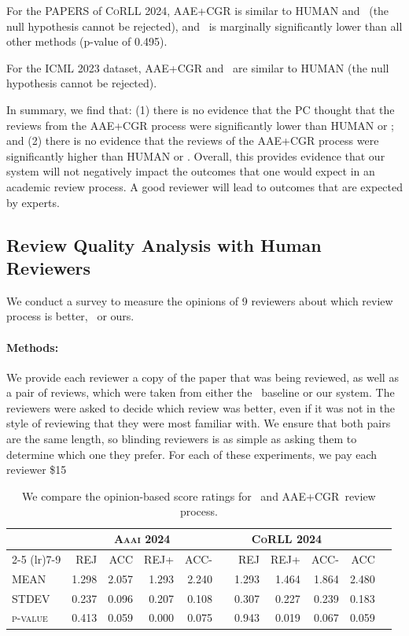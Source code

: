\begin{minipage}[t]{\linewidth}
For the PAPERS of \textsc{CoRLL 2024}, AAE+CGR is similar to HUMAN and \singlellm\ (the null hypothesis cannot be rejected), and \reviewergpt\ is marginally significantly lower than all other methods (p-value of 0.495).

For the \textsc{ICML 2023} dataset, AAE+CGR and \singlellm\ are similar to HUMAN (the null hypothesis cannot be rejected).

In summary, we find that: (1) there is no evidence that the PC thought that the reviews from the AAE+CGR process were significantly lower than HUMAN or \singlellm; and (2) there is no evidence that the reviews of the AAE+CGR process were significantly higher than HUMAN or \singlellm. 
Overall, this provides evidence that our system will not negatively impact the outcomes that one would expect in an academic review process. 
A good reviewer will lead to outcomes that are expected by experts. 
\subsection{Review Quality Analysis with Human Reviewers}

We conduct a survey to measure the opinions of 9 reviewers about which review process is better, \singlellm\ or ours. 

\paragraph{Methods:}
We provide each reviewer a copy of the paper that was being reviewed, as well as a pair of reviews, which were taken from either the \singlellm\ baseline or our system. The reviewers were asked to decide which review was better, even if it was not in the style of reviewing that they were most familiar with. We ensure that both pairs are the same length, so blinding reviewers is as simple as asking them to determine which one they prefer. For each of these experiments, we pay each reviewer \$15 

\begin{table}[t]
\centering
\caption{We compare the opinion-based score ratings for \singlellm\ and AAE+CGR\ review process.}
\begin{tabular}{l|rrrr|rrr|rrr}
\toprule
\multirow{2}{*}{\textbf{}}        & \multicolumn{4}{c|}{\textbf{\textsc{Aaai 2024}}}            &  & \multicolumn{3}{c}{\textbf{\textsc{CoRLL 2024}}} \\
\cmidrule(lr){2-5} \cmidrule(lr){7-9}
                         & REJ   & ACC    & REJ+    & ACC-    &  & REJ   & REJ+    & ACC-    & ACC \\
\textsc{MEAN}              & 1.298 & 2.057 & 1.293 & 2.240 &  & 1.293 & 1.464 & 1.864 & 2.480 \\ \hline
\textsc{STDEV}            & 0.237 & 0.096 & 0.207 & 0.108 &  & 0.307 & 0.227 & 0.239 & 0.183 \\
\textsc{p-value}         & 0.413 & 0.059 & 0.000 & 0.075 &  & 0.943 & 0.019 & 0.067 & 0.059 \\


\end{tabular}
\end{table}
\end{minipage}
